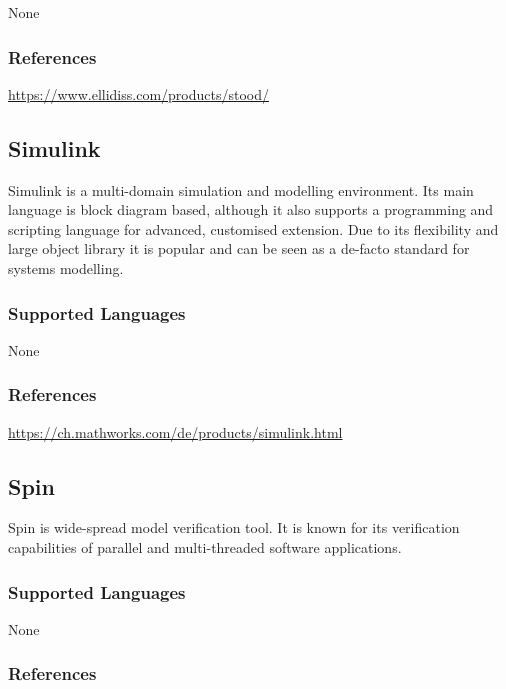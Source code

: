 None


\subsubsection{References}

\url{https://www.ellidiss.com/products/stood/}




\subsection{Simulink}
\label{subsecT:Simulink}


Simulink is a multi-domain simulation and modelling environment.
Its main language is block diagram based, although it also supports a programming and scripting language for advanced, customised extension. 
Due to its flexibility and large object library it is popular and can be seen as a de-facto standard for systems modelling.


\subsubsection{Supported Languages}

None


\subsubsection{References}

\url{https://ch.mathworks.com/de/products/simulink.html}


\subsection{Spin}
\label{subsecT:Spin}


Spin is wide-spread model verification tool.
It is known for its verification capabilities of parallel and multi-threaded software applications.

\subsubsection{Supported Languages}

None


\subsubsection{References}

